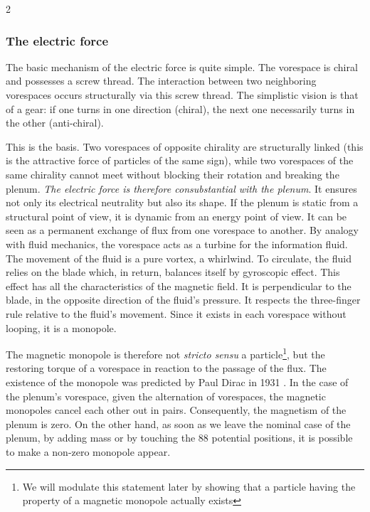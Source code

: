 \begin{multicols}{2}
	\subsubsection{The electric force}
	
	The basic mechanism of the electric force is quite simple. The vorespace 
	is chiral and possesses a screw thread. The interaction between two 
	neighboring vorespaces occurs structurally via this screw thread. The 
	simplistic vision is that of a gear: if one turns in one direction 
	(chiral), the next one necessarily turns in the other (anti-chiral).
	
	This is the basis. Two vorespaces of opposite chirality are structurally 
	linked (this is the attractive force of particles of the same sign), 
	while two vorespaces of the same chirality cannot meet without blocking 
	their rotation and breaking the plenum. \textit{The electric force is 
		therefore consubstantial with the plenum}. It ensures not only its 
	electrical neutrality but also its shape. If the plenum is static from a 
	structural point of view, it is dynamic from an energy point of view. It 
	can be seen as a permanent exchange of flux from one vorespace to 
	another. By analogy with fluid mechanics, the vorespace acts as a 
	turbine for the information fluid. The movement of the fluid is a pure 
	vortex, a whirlwind. To circulate, the fluid relies on the blade which, 
	in return, balances itself by gyroscopic effect. This effect has all the 
	characteristics of the magnetic field. It is perpendicular to the blade, 
	in the opposite direction of the fluid's pressure. It respects the 
	three-finger rule relative to the fluid's movement. Since it exists in 
	each vorespace without looping, it is a monopole.
	
	The magnetic monopole is therefore not \textit{stricto sensu} a 
	particle\footnote{We will modulate this statement later by showing that a particle having the property of a magnetic monopole actually exists}, 
	but the restoring torque of a vorespace in reaction to the passage of 
	the flux. The existence of the monopole was predicted by Paul Dirac in 
	1931 \cite{dirac1931quantised}. In the case of the plenum's vorespace, given the 
	alternation of vorespaces, the magnetic monopoles cancel each other out in 
	pairs. Consequently, the magnetism of the plenum is zero. On the other 
	hand, as soon as we leave the nominal case of the plenum, by adding mass 
	or by touching the 88 potential positions, it is possible to make a 
	non-zero monopole appear.
	

\end{multicols}
